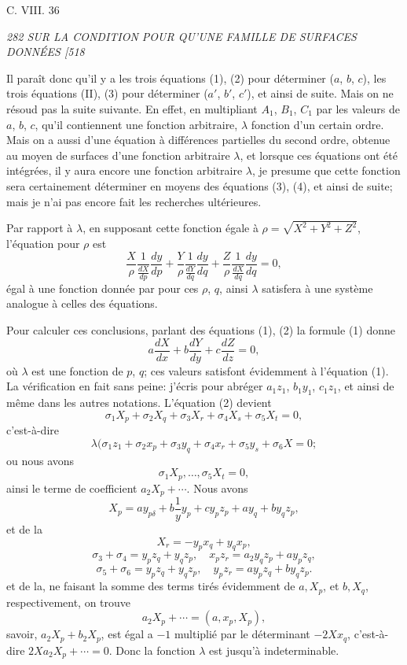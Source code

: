\documentclass[11pt,a4paper]{book}
\begin{document}
\medskip
\hfill C. VIII. \hfill 36

\clearpage

\noindent\textit{282 \hfill SUR LA CONDITION POUR QU'UNE FAMILLE DE SURFACES DONN\'EES \hfill [518}

\medskip

Il para\^it donc qu'il y a les trois \'equations (1), (2) pour d\'eterminer ($a$, $b$, $c$), les
trois \'equations (II), (3) pour d\'eterminer ($a'$, $b'$, $c'$), et ainsi de suite. Mais on ne r\'esoud
pas la suite suivante. En effet, en multipliant $A_1$, $B_1$, $C_1$ par les valeurs de $a$, $b$, $c$, qu'il
contiennent une fonction arbitraire, $\lambda$ fonction d'un certain ordre. Mais on a aussi
d'une \'equation \`a diff\'erences partielles du second ordre, obtenue au moyen de surfaces
d'une fonction arbitraire $\lambda$, et lorsque ces \'equations ont \'et\'e int\'egr\'ees, il y aura encore une
fonction arbitraire $\lambda$, je presume que cette fonction sera certainement d\'eterminer en
moyens des \'equations (3), (4), et ainsi de suite; mais je n'ai pas encore fait les recherches ult\'erieures.

\medskip

Par rapport \`a $\lambda$, en supposant cette fonction \'egale \`a $\rho = \sqrt{X^2 + Y^2 + Z^2}$, l'\'equation
pour $\rho$ est
\[
\frac{X}{\rho}\frac{1}{\frac{dX}{dp}}\frac{dy}{dp} + \frac{Y}{\rho}\frac{1}{\frac{dY}{dq}}\frac{dy}{dq} + \frac{Z}{\rho}\frac{1}{\frac{dX}{dq}}\frac{dy}{dq} = 0,
\]
\'egal \`a une fonction donn\'ee par pour ces $\rho$, $q$, ainsi $\lambda$ satisfera \`a une syst\`eme
analogue \`a celles des \'equations.

\medskip

Pour calculer ces conclusions, parlant des \'equations (1), (2) la formule (1) donne
\[
a\frac{dX}{dx} + b\frac{dY}{dy} + c\frac{dZ}{dz} = 0,
\]
o\`u $\lambda$ est une fonction de $p$, $q$; ces valeurs satisfont \'evidemment \`a l'\'equation (1). La
v\'erification en fait sans peine: j'\'ecris pour abr\'eger $a_1z_1$, $b_1y_1$, $c_1z_1$, et ainsi de
m\^eme dans les autres notations. L'\'equation (2) devient
\[
\sigma_1 X_p + \sigma_2 X_q + \sigma_3 X_r + \sigma_4 X_s + \sigma_5 X_t = 0,
\]
c'est-\`a-dire
\[
\lambda(\sigma_1 z_1 + \sigma_2 x_p + \sigma_3 y_q + \sigma_4 x_r + \sigma_5 y_s + \sigma_6 X = 0;
\]
ou nous avons
\[
\sigma_1 X_p, \ldots, \sigma_5 X_t = 0,
\]
ainsi le terme de coefficient $a_2 X_p + \cdots$. Nous avons
\[
X_p = a y_{p\delta} + b\frac{1}{y} y_p + c y_p z_p + a y_q + b y_q z_p,
\]
et de la
\[
X_r = - y_p x_q + y_q x_p,
\]
\[
\sigma_3 + \sigma_4 = y_p z_q + y_q z_p, \quad x_p z_r = a_2 y_q z_p + a y_p z_q,
\]
\[
\sigma_5 + \sigma_6 = y_p z_q + y_q z_p, \quad y_p z_r = a y_p z_q + b y_q z_p.
\]
et de la, ne faisant la somme des terms tir\'es \'evidemment de $a, X_p$, et $b, X_q$, respectivement, on
trouve
\[
a_2 X_p + \cdots = (a, x_p, X_p),
\]
savoir, $a_2X_p + b_2 X_p$, est \'egal a $-1$ multipli\'e par le d\'eterminant $- 2X x_q$, c'est-\`a-dire
$2X a_2 X_p + \cdots = 0$. Donc la fonction $\lambda$ est jusqu'\`a indeterminable.
\end{document}
